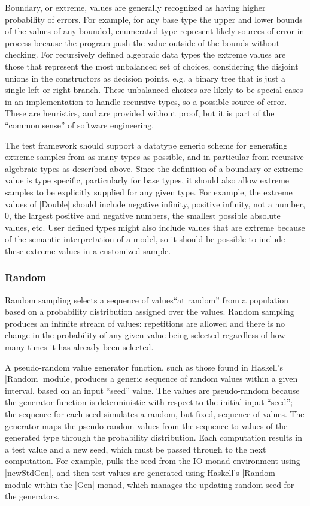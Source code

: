 
Boundary, or extreme, values are generally recognized as having higher probability of errors.
For example, for any base type the upper and lower bounds of the values
of any bounded, enumerated type represent likely sources of error
in process because the program push the value outside of the bounds without checking.
For recursively defined algebraic data types
the extreme values are those that represent the most unbalanced set of choices,
considering the disjoint unions in the constructors as decision points,
e.g. a binary tree that is just a single left or right branch.
These unbalanced choices are likely to be special cases in
an implementation to handle recursive types,
so a possible source of error.
These are heuristics, and are provided without proof,
but it is part of the ``common sense'' of software engineering.

The test framework should support a datatype generic scheme
for generating extreme samples from as many types as possible,
and in particular from recursive algebraic types as described above.
Since the definition of a boundary or extreme value is type specific,
particularly for base types, 
it should also allow extreme samples to be 
explicitly supplied for any given type.
For example,
the extreme values of  |Double| should include negative infinity,
positive infinity, not a number, 0, the largest positive and negative numbers,
the smallest possible absolute values, etc.
User defined types might also include values that are extreme because
of the semantic interpretation of a model,
so it should be possible to include these extreme values in a customized sample.


\subsubsection{Random}

Random sampling selects a sequence of values``at random'' 
from a population based on a probability distribution assigned over the values.
Random sampling produces an infinite stream of values:
repetitions are allowed and 
there is no change in the probability of any given value being selected
regardless of how many times it has already been selected.

A pseudo-random value generator function,
such as those found in Haskell's  |Random| module,
produces a generic sequence of random values within a given interval.
based on an input ``seed'' value.
The values are pseudo-random because the generator function
is deterministic with respect to the initial input ``seed'';
the sequence for each seed simulates a random, but fixed, sequence of values.
The generator maps the pseudo-random values from the sequence
to values of the generated type through the probability distribution.
Each computation results in a test value and a new seed,
which must be passed through to the next computation.
For example, \QC pulls the seed from the IO monad environment using |newStdGen|,
and then test values are generated using Haskell's |Random| module within the |Gen| monad, 
which manages the updating random seed for the generators.

